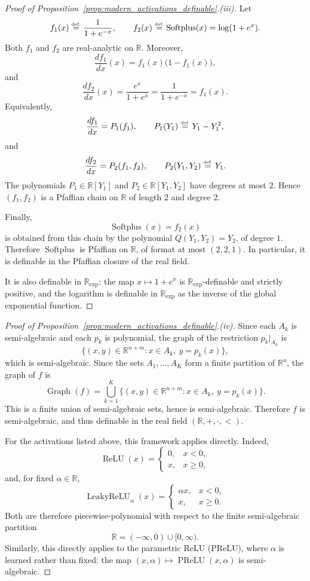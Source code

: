 \documentclass{article}
\newcommand{\eqdef}{\ensuremath{\stackrel{\mbox{\upshape\tiny def.}}{=}}}
\theoremstyle{plain}
\theoremstyle{definition}
\theoremstyle{remark}
\theoremstyle{plain}
\numberwithin{thm}{section}
\theoremstyle{definition}
\numberwithin{equation}{section}
\begin{document}
\begin{proof}[{Proof of Proposition~\ref{prop:modern_activations_definable}.(iii)}]
Let
\[
    f_1(x)\eqdef \frac{1}{1+e^{-x}},
    \qquad
    f_2(x)\eqdef \operatorname{Softplus}(x)=\log(1+e^x).
\]
Both \(f_1\) and \(f_2\) are real-analytic on \(\mathbb{R}\). Moreover,
\[
    \frac{d f_1}{dx}(x)
    =
    f_1(x)\bigl(1-f_1(x)\bigr),
\]
and
\[
    \frac{d f_2}{dx}(x)
    =
    \frac{e^x}{1+e^x}
    =
    \frac{1}{1+e^{-x}}
    =
    f_1(x).
\]
Equivalently,
\[
    \frac{d f_1}{dx}
    =
    P_1(f_1),
    \qquad
    P_1(Y_1)\eqdef Y_1-Y_1^2,
\]
and
\[
    \frac{d f_2}{dx}
    =
    P_2(f_1,f_2),
    \qquad
    P_2(Y_1,Y_2)\eqdef Y_1.
\]
The polynomials \(P_1\in\mathbb{R}[Y_1]\) and
\(P_2\in\mathbb{R}[Y_1,Y_2]\) have degrees at most \(2\). Hence
\((f_1,f_2)\) is a Pfaffian chain on \(\mathbb{R}\) of length \(2\) and degree
\(2\).

Finally,
\[
    \operatorname{Softplus}(x)=f_2(x)
\]
is obtained from this chain by the polynomial \(Q(Y_1,Y_2)=Y_2\), of degree
\(1\). Therefore \(\operatorname{Softplus}\) is Pfaffian on \(\mathbb{R}\), of
format at most \((2,2,1)\). In particular, it is definable in the Pfaffian
closure of the real field.

It is also definable in \(\mathbb{R}_{\exp}\): the map \(x\mapsto 1+e^x\) is
\(\mathbb{R}_{\exp}\)-definable and strictly positive, and the logarithm is
definable in \(\mathbb{R}_{\exp}\) as the inverse of the global exponential
function.
\end{proof}

\begin{proof}[{Proof of Proposition~\ref{prop:modern_activations_definable}.(iv)}]
Since each $A_k$ is semi-algebraic and each $p_k$ is polynomial, the graph of
the restriction $p_k|_{A_k}$ is
\[
    \{(x,y)\in\mathbb{R}^{n+m}: x\in A_k,\ y=p_k(x)\},
\]
which is semi-algebraic. Since the sets $A_1,\dots,A_K$ form a finite
partition of $\mathbb{R}^n$, the graph of $f$ is
\[
    \operatorname{Graph}(f)
    =
    \bigcup_{k=1}^K
    \{(x,y)\in\mathbb{R}^{n+m}: x\in A_k,\ y=p_k(x)\}.
\]
This is a finite union of semi-algebraic sets, hence is semi-algebraic.
Therefore $f$ is semi-algebraic, and thus definable in the real field
$(\mathbb{R},+,\cdot,<)$.

For the activations listed above, this framework applies directly. Indeed,
\[
    \operatorname{ReLU}(x)
    =
    \begin{cases}
        0, & x<0,\\
        x, & x\ge 0,
    \end{cases}
\]
and, for fixed \(\alpha\in\mathbb{R}\),
\[
    \operatorname{LeakyReLU}_{\alpha}(x)
    =
    \begin{cases}
        \alpha x, & x<0,\\
        x, & x\ge 0.
    \end{cases}
\]
Both are therefore piecewise-polynomial with respect to the finite
semi-algebraic partition
\[
    \mathbb{R}=(-\infty,0)\cup[0,\infty).
\]
Similarly, this directly applies to the parametric ReLU (PReLU), where \(\alpha\) is learned rather than fixed: the map
\((x,\alpha)\mapsto \operatorname{PReLU}(x,\alpha)\) is semi-algebraic.
\end{proof}
\end{document}
